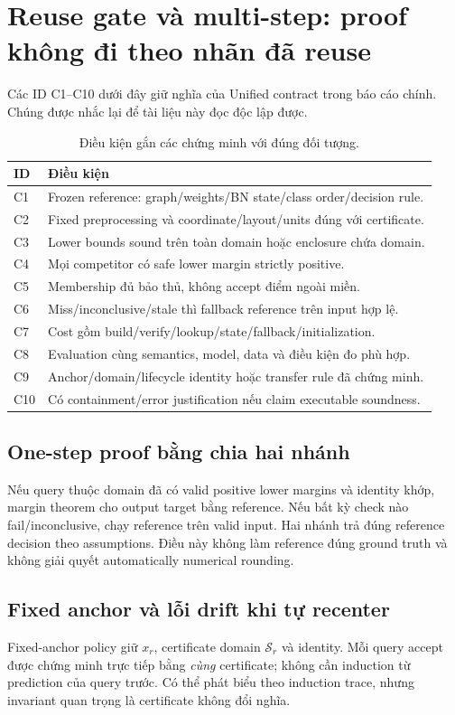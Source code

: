 \documentclass[11pt,a4paper]{article}
\newcommand{\Sset}{\mathcal S}
\theoremstyle{definition}
\begin{document}
\section{Reuse gate và multi-step: proof không đi theo nhãn đã reuse}
Các ID C1--C10 dưới đây giữ nghĩa của Unified contract trong báo cáo chính.
Chúng được nhắc lại để tài liệu này đọc độc lập được.
\begin{table}[!htbp]\centering\small
\caption{Điều kiện gắn các chứng minh với đúng đối tượng.}
\begin{tabularx}{\linewidth}{@{}p{1cm}Y@{}}\toprule
ID & Điều kiện\\\midrule
C1 & Frozen reference: graph/weights/BN state/class order/decision rule.\\
C2 & Fixed preprocessing và coordinate/layout/units đúng với certificate.\\
C3 & Lower bounds sound trên toàn domain hoặc enclosure chứa domain.\\
C4 & Mọi competitor có safe lower margin strictly positive.\\
C5 & Membership đủ bảo thủ, không accept điểm ngoài miền.\\
C6 & Miss/inconclusive/stale thì fallback reference trên input hợp lệ.\\
C7 & Cost gồm build/verify/lookup/state/fallback/initialization.\\
C8 & Evaluation cùng semantics, model, data và điều kiện đo phù hợp.\\
C9 & Anchor/domain/lifecycle identity hoặc transfer rule đã chứng minh.\\
C10 & Có containment/error justification nếu claim executable soundness.\\\bottomrule
\end{tabularx}
\end{table}
\subsection{One-step proof bằng chia hai nhánh}
Nếu query thuộc domain đã có valid positive lower margins và identity
khớp, margin theorem cho output target bằng reference. Nếu bất kỳ check
nào fail/inconclusive, chạy reference trên valid input. Hai nhánh trả đúng
reference decision theo assumptions. Điều này không làm reference đúng
ground truth và không giải quyết automatically numerical rounding.

\subsection{Fixed anchor và lỗi drift khi tự recenter}
Fixed-anchor policy giữ $x_r$, certificate domain $\Sset_r$ và identity.
Mỗi query accept được chứng minh trực tiếp bằng \emph{cùng} certificate;
không cần induction từ prediction của query trước. Có thể phát biểu theo
induction trace, nhưng invariant quan trọng là certificate không đổi nghĩa.
\end{document}
